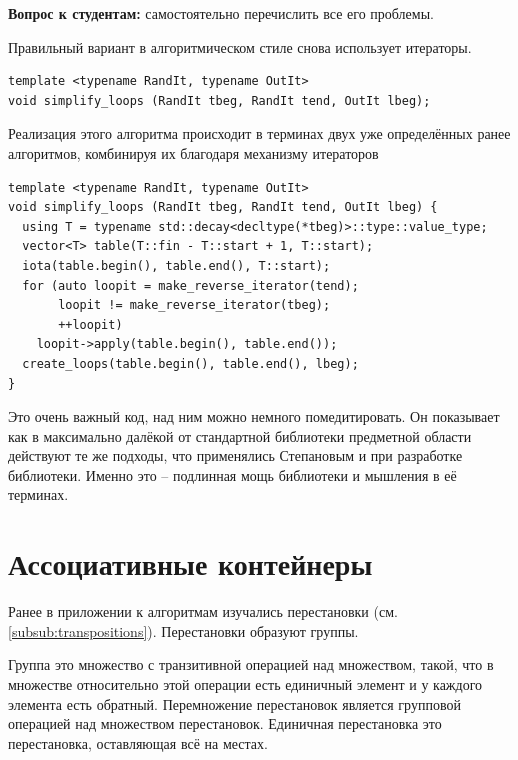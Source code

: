 \documentclass[a4paper,12pt,oneside]{book}
\newif\ifanswers
\begin{document}
\textbf{Вопрос к студентам:} самостоятельно перечислить все его проблемы.

\ifanswers
Ответ: в общем всё довольно очевидно и уже было перечислено выше. Вмерзает в код тип контейнера, не поддерживается часть последовательности, всё вот это вот.
\fi

Правильный вариант в алгоритмическом стиле снова использует итераторы.

\begin{lstlisting}
template <typename RandIt, typename OutIt>
void simplify_loops (RandIt tbeg, RandIt tend, OutIt lbeg);
\end{lstlisting}

Реализация этого алгоритма происходит в терминах двух уже определённых ранее алгоритмов, комбинируя их благодаря механизму итераторов

\begin{lstlisting}
template <typename RandIt, typename OutIt>
void simplify_loops (RandIt tbeg, RandIt tend, OutIt lbeg) {
  using T = typename std::decay<decltype(*tbeg)>::type::value_type;
  vector<T> table(T::fin - T::start + 1, T::start);
  iota(table.begin(), table.end(), T::start);
  for (auto loopit = make_reverse_iterator(tend);
       loopit != make_reverse_iterator(tbeg);
       ++loopit)
    loopit->apply(table.begin(), table.end());
  create_loops(table.begin(), table.end(), lbeg);
}
\end{lstlisting}

Это очень важный код, над ним можно немного помедитировать. Он показывает как в максимально далёкой от стандартной библиотеки предметной области действуют те же подходы, что применялись Степановым и при разработке библиотеки. Именно это -- подлинная мощь библиотеки и мышления в её терминах.

\pagebreak
\section{Ассоциативные контейнеры}\label{AssociativeContainers}

Ранее в приложении к алгоритмам изучались перестановки (см. \ref{subsub:transpositions}). Перестановки образуют группы.

Группа это множество с транзитивной операцией над множеством, такой, что в множестве относительно этой операции есть единичный элемент и у каждого элемента есть обратный. Перемножение перестановок является групповой операцией над множеством перестановок. Единичная перестановка это перестановка, оставляющая всё на местах.
\end{document}
